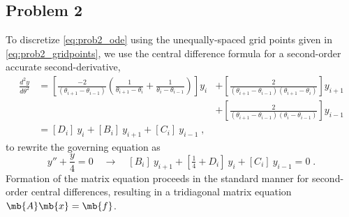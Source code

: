 \documentclass[11pt]{article}
\begin{document}
\subsection{Problem 2}

To discretize \eqref{eq:prob2_ode} using the unequally-spaced grid points given in \eqref{eq:prob2_gridpoints}, we use the central difference formula for a second-order accurate second-derivative,
\begin{equation}
\begin{aligned}
\frac{d^2 y}{d \theta^2}
&=
\left[
\frac{-2}{(\theta_{i+1} - \theta_{i-1})}
\left(
\frac{1}{\theta_{i+1} - \theta_i}
+
\frac{1}{\theta_i - \theta_{i-1}}
\right)
\right] y_i
\!\!\!\!
&+\left[
\frac{2}{(\theta_{i+1} - \theta_{i-1})(\theta_{i+1} - \theta_{i})}
\right] y_{i+1}
\\
&&+\left[
\frac{2}{(\theta_{i+1} - \theta_{i-1})(\theta_i - \theta_{i-1})}
\right] y_{i-1}
\\
&=
[D_i] \: y_i + [B_i] \: y_{i+1} + [C_i] \: y_{i-1}
\;,
\end{aligned}
\end{equation}
to rewrite the governing equation as
\begin{equation}
y'' + \frac{y}{4} = 0
\quad \rightarrow \quad
[B_i] \: y_{i+1} + [\tfrac{1}{4} + D_i] \: y_i + [C_i] \: y_{i-1} = 0
\;.
\end{equation}
Formation of the matrix equation proceeds in the standard manner for second-order central differences, resulting in a tridiagonal matrix equation $\mb{A} \mb{x} = \mb{f}$.
\end{document}
